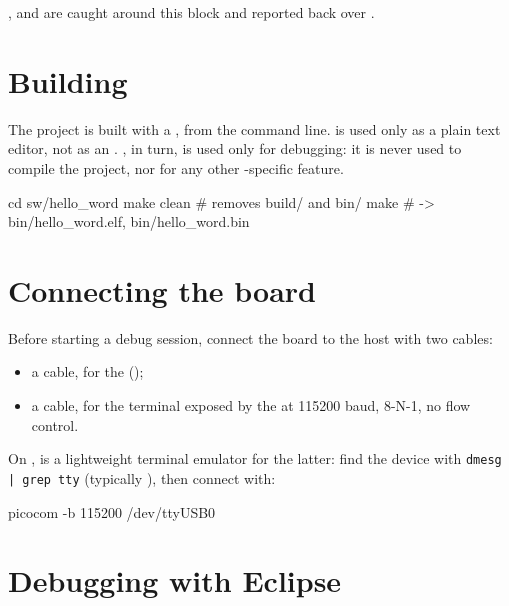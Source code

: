 ,  and  are caught around this block and reported back over .

\section{Building}
\label{sec:fpgasteel-hello-building}

The project is built with a , from the command line.  is used only as a plain text editor, not as an . , in turn, is used only for debugging: it is never used to compile the project, nor for any other -specific feature.

\begin{shellcodehost}
cd sw/hello_word
make clean   # removes build/ and bin/
make
# -> bin/hello_word.elf, bin/hello_word.bin
\end{shellcodehost}

\section{Connecting the board}
\label{sec:fpgasteel-hello-connecting}

Before starting a debug session, connect the board to the host  with two  cables:

\begin{itemize}
    \item a  cable, for the  ();
    \item a  cable, for the  terminal exposed by the  at 115200 baud, 8-N-1, no flow control.
\end{itemize}

On ,  is a lightweight terminal emulator for the latter: find the device with \lstinline[style=inlineCmdExt]!dmesg | grep tty! (typically ), then connect with:

\begin{shellcodehost}
picocom -b 115200 /dev/ttyUSB0
\end{shellcodehost}

\section{Debugging with Eclipse}
\label{sec:fpgasteel-hello-jtag-debug}

